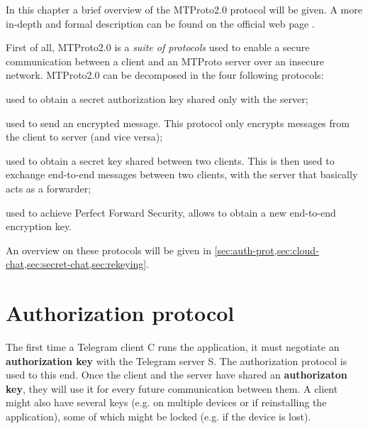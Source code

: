 
In this chapter a brief overview of the MTProto2.0 protocol will be given. A more in-depth and formal description can be found on the official web page \cite{Telegram-MTProto2.0}.

First of all, MTProto2.0 is a \textit{suite of protocols} used to enable a secure communication between a client and an MTProto server over an insecure network. MTProto2.0 can be decomposed in the four following protocols:

\begin{description}[style=nextline]
    \item[Authorization] used to obtain a secret authorization key shared only with the server;
    \item[Cloud-chat] used to send an encrypted message. This protocol only encrypts messages from the client to server (and vice versa);
    \item[Secret-chat] used to obtain a secret key shared between two clients. This is then used to exchange end-to-end messages between two clients, with the server that basically acts as a forwarder;
    \item[Rekeying] used to achieve Perfect Forward Security, allows to obtain a new end-to-end encryption key.
\end{description}

An overview on these protocols will be given in \cref{sec:auth-prot,sec:cloud-chat,sec:secret-chat,sec:rekeying}.

\section{Authorization protocol}
\label{sec:auth-prot}

The first time a Telegram client C runs the application, it must negotiate an \textbf{authorization key} with the Telegram server S. The authorization protocol is used to this end. Once the client and the server have shared an \textbf{authorizaton key}, they will use it for every future communication between them. A client might also have several keys (e.g. on multiple devices or if reinstalling the application), some of which might be locked (e.g. if the device is lost).

